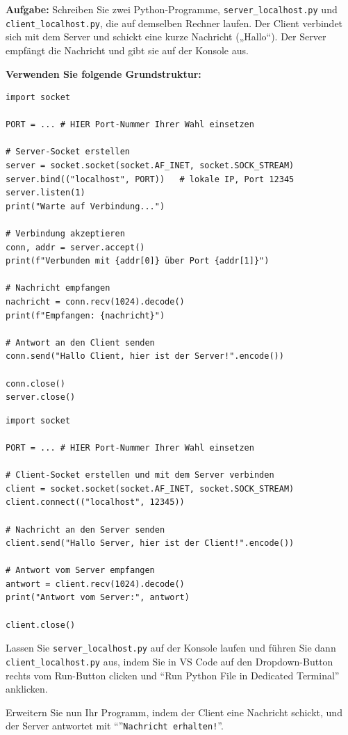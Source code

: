 \begin{myexercise}

    \textbf{Aufgabe:} Schreiben Sie zwei Python-Programme, \texttt{server\_localhost.py} und \texttt{client\_localhost.py}, die auf demselben Rechner laufen. Der Client verbindet sich mit dem Server und schickt eine kurze Nachricht („Hallo“). Der Server empfängt die Nachricht und gibt sie auf der Konsole aus.

    \textbf{Verwenden Sie folgende Grundstruktur:}

    \begin{lstlisting}[caption={server\_localhost.py}]
import socket

PORT = ... # HIER Port-Nummer Ihrer Wahl einsetzen

# Server-Socket erstellen
server = socket.socket(socket.AF_INET, socket.SOCK_STREAM)
server.bind(("localhost", PORT))   # lokale IP, Port 12345
server.listen(1)
print("Warte auf Verbindung...")

# Verbindung akzeptieren
conn, addr = server.accept()
print(f"Verbunden mit {addr[0]} über Port {addr[1]}")

# Nachricht empfangen
nachricht = conn.recv(1024).decode()
print(f"Empfangen: {nachricht}")

# Antwort an den Client senden
conn.send("Hallo Client, hier ist der Server!".encode())

conn.close()
server.close()
\end{lstlisting}

    \begin{lstlisting}[caption={client\_localhost.py}]
import socket

PORT = ... # HIER Port-Nummer Ihrer Wahl einsetzen

# Client-Socket erstellen und mit dem Server verbinden
client = socket.socket(socket.AF_INET, socket.SOCK_STREAM)
client.connect(("localhost", 12345))

# Nachricht an den Server senden
client.send("Hallo Server, hier ist der Client!".encode())

# Antwort vom Server empfangen
antwort = client.recv(1024).decode()
print("Antwort vom Server:", antwort)

client.close()
\end{lstlisting}
    Lassen Sie \texttt{server\_localhost.py} auf der Konsole laufen und führen Sie dann \texttt{client\_localhost.py} aus, indem Sie in VS Code auf den Dropdown-Button rechts vom Run-Button clicken und ``Run Python File in Dedicated Terminal'' anklicken.

    Erweitern Sie nun Ihr Programm, indem der Client eine Nachricht schickt, und der Server antwortet mit ``''\texttt{Nachricht erhalten!}''.
    \begin{myanswer}
    
    
    \end{myanswer}
\end{myexercise}

